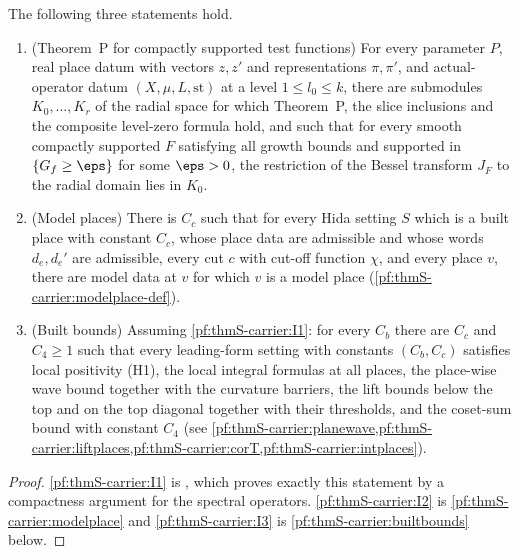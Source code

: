 \begin{proposition}\label{pf:thmS-carrier:needs}
The following three statements hold.
\begin{enumerate}[label=(I\arabic*)]
\item\label{pf:thmS-carrier:I1} (Theorem~P for compactly supported test functions) For every parameter $P$, real place
  datum with vectors $z,z'$ and representations $\pi,\pi'$, and actual-operator datum $(X,\mu,L,\mathrm{st})$ at a level
  $1\le l_0\le k$, there are submodules $K_0,\dots,K_r$ of the radial space for which Theorem~P, the slice inclusions and
  the composite level-zero formula hold, and such that for every smooth compactly supported $F$ satisfying all growth
  bounds and supported in $\{G_f\ge\eps\}$ for some $\eps>0$, the restriction of the Bessel transform $J_F$ to the radial
  domain lies in $K_0$.
\item\label{pf:thmS-carrier:I2} (Model places) There is $C_c$ such that for every Hida setting $S$ which is a built place
  with constant $C_c$, whose place data are admissible and whose words $d_e,d_e'$ are admissible, every cut $c$ with
  cut-off function $\chi$, and every place $v$, there are model data at $v$ for which $v$ is a model place
  (\cref{pf:thmS-carrier:modelplace-def}).
\item\label{pf:thmS-carrier:I3} (Built bounds) Assuming \ref{pf:thmS-carrier:I1}: for every $C_b$ there are $C_c$ and
  $C_4\ge1$ such that every leading-form setting with constants $(C_b,C_c)$ satisfies local positivity (H1), the local
  integral formulas at all places, the place-wise wave bound together with the curvature barriers, the lift bounds below
  the top and on the top diagonal together with their thresholds, and the coset-sum bound with constant $C_4$ (see
  \cref{pf:thmS-carrier:planewave,pf:thmS-carrier:liftplaces,pf:thmS-carrier:corT,pf:thmS-carrier:intplaces}).
\end{enumerate}
\end{proposition}

\begin{proof}
\ref{pf:thmS-carrier:I1} is , which proves exactly this
statement by a compactness argument for the spectral operators. \ref{pf:thmS-carrier:I2} is \cref{pf:thmS-carrier:modelplace}
and \ref{pf:thmS-carrier:I3} is \cref{pf:thmS-carrier:builtbounds} below.
\end{proof}

